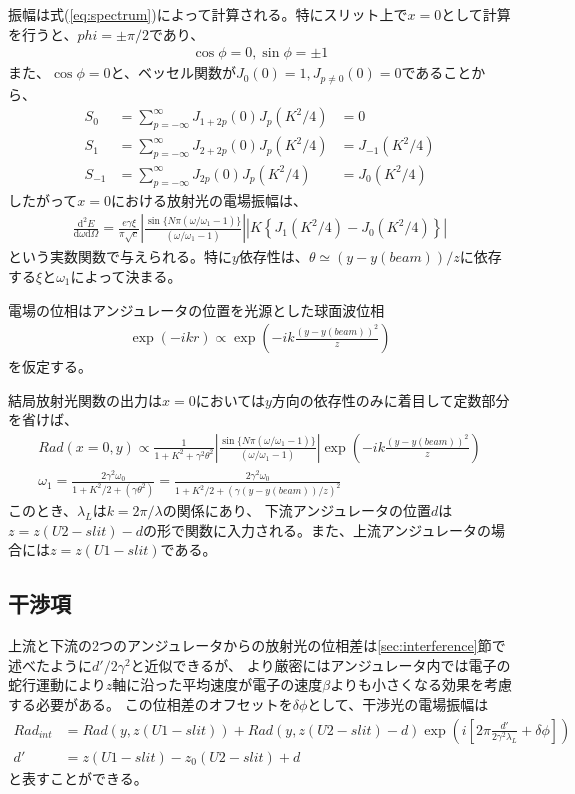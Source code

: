 \documentclass[a4paper,11pt,uplatex]{jsbook}
\begin{document}
振幅は式(\ref{eq:spectrum})によって計算される。特にスリット上で$x=0$として計算を行うと、$phi = \pm\pi/2$であり、 
\begin{align}
  \cos \phi = 0, \sin \phi = \pm 1
\end{align}
また、$\cos \phi = 0$と、ベッセル関数が$J_0(0) = 1, J_{p\ne 0}(0) = 0$であることから、
\begin{align}
  S_0 &= \sum_{p = -\infty}^{\infty} J_{1+2p}(0)J_p(K^2/4)  &= 0 \\
  S_1 &= \sum_{p = -\infty}^{\infty} J_{2+2p}(0)J_p(K^2/4)  &=  J_{-1}(K^2/4)\\
  S_{-1} &= \sum_{p = -\infty}^{\infty} J_{2p}(0)J_p(K^2/4) &= J_0(K^2/4)
\end{align}
したがって$x=0$における放射光の電場振幅は、
\begin{align}
  \frac{\text{d}^2E}{\text{d}\omega \text{d}\Omega} = \frac{e\gamma\xi}{\pi \sqrt{c}}\left| \frac{\sin \{N\pi(\omega/\omega_1 -1)\}}{(\omega/\omega_1 -1)} \right|
  \left| K\left\{ J_1(K^2/4) - J_0(K^2/4) \right\} \right|
\end{align}
という実数関数で与えられる。特に$y$依存性は、$\theta \simeq (y -y(beam))/ z$に依存する$\xi$と$\omega_1$によって決まる。

電場の位相はアンジュレータの位置を光源とした球面波位相
\begin{align}
  \exp(-ikr) \propto \exp( -ik \frac{(y - y(beam))^2}{z})
\end{align}を仮定する。

結局放射光関数の出力は$x=0$においては$y$方向の依存性のみに着目して定数部分を省けば、
\begin{align}
  Rad(x=0, y) \propto \frac{1}{1 + K^2 +\gamma^2\theta^2}\left| \frac{\sin \{N\pi(\omega/\omega_1 -1)\}}{(\omega/\omega_1 -1)} \right| \exp( -ik \frac{(y-y(beam))^2}{z})\\
   \omega_1 = \frac{2\gamma^2\omega_0}{1+ K^2/2+(\gamma \theta^2)}  = \frac{2\gamma^2\omega_0}{1+ K^2/2+(\gamma (y-y(beam))/z)^2} 
\end{align}
このとき、$\lambda_L$は$k = 2\pi/\lambda$の関係にあり、
下流アンジュレータの位置$d$は$z = z(U2-slit) - d $の形で関数に入力される。また、上流アンジュレータの場合には$z = z(U1-slit)$である。
\subsection{干渉項}
上流と下流の2つのアンジュレータからの放射光の位相差は\ref{sec:interference}節で述べたように$d'/2\gamma^2$と近似できるが、
より厳密にはアンジュレータ内では電子の蛇行運動により$z$軸に沿った平均速度が電子の速度$\beta$よりも小さくなる効果を考慮する必要がある。
この位相差のオフセットを$\delta \phi$として、干渉光の電場振幅は
\begin{align}
  Rad_{int} &= Rad(y, z(U1-slit)) + Rad(y, z(U2-slit) -d )\exp(i \left[2\pi \frac{d'}{2\gamma^2\lambda_L} + \delta \phi\right])\\
  d' &= z(U1-slit) - z_0(U2-slit) + d
\end{align}
と表すことができる。
\end{document}
